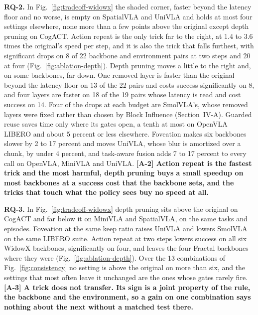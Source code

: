 \textbf{RQ-2.} In Fig.~\ref{fig:tradeoff-widowx} the shaded corner,
faster beyond the latency floor and no worse, is empty on SpatialVLA and UniVLA and holds at most
four settings elsewhere, none more than a few points above the original
except depth pruning on CogACT. Action repeat is the only trick far to
the right, at 1.4 to 3.6 times the original's speed per step, and it is
also the trick that falls furthest, with significant drops on 8 of 22
backbone and environment pairs at two steps and 20 at four
(Fig.~\ref{fig:ablation-depth}). Depth pruning moves a little to the
right and, on some backbones, far down. One removed layer is faster than
the original beyond the latency floor on 13 of the 22 pairs and costs
success significantly on 8, and four layers are faster on 18 of the 19 pairs whose latency is
read and cost success on 14. Four of the drops at each budget are
SmolVLA's, whose removed layers were fixed rather than chosen by Block
Influence (Section~IV-A).
Guarded reuse saves time only where its gates open, a
tenth at most on OpenVLA LIBERO and about 5 percent or less elsewhere.
Foveation makes six backbones slower by 2 to 17 percent and moves UniVLA,
whose blur is amortized over a chunk, by under 4 percent, and task-aware
fusion adds 7 to 17 percent to every call on OpenVLA, MiniVLA and UniVLA.
\textbf{[A-2] Action repeat
is the fastest trick and the most harmful, depth pruning buys a small
speedup on most backbones at a success cost that the backbone sets, and
the tricks that touch what the policy sees buy no speed at all.}

\textbf{RQ-3.} In Fig.~\ref{fig:tradeoff-widowx} depth pruning sits above
the original on CogACT and far below it on MiniVLA and SpatialVLA, on the same
tasks and episodes. Foveation at the same keep ratio raises UniVLA and
lowers SmolVLA on the same LIBERO suite. Action repeat at two steps
lowers success on all six WidowX backbones, significantly on four, and
leaves the four Fractal
backbones where they were (Fig.~\ref{fig:ablation-depth}).
Over the 13 combinations of Fig.~\ref{fig:consistency} no setting is
above the original on more than six,
and the settings that most often leave it unchanged are the ones whose
gates rarely fire. \textbf{[A-3] A trick does not transfer.
Its sign is a joint property of the rule, the backbone and the
environment, so a gain on one combination says nothing about the next
without a matched test there.}

